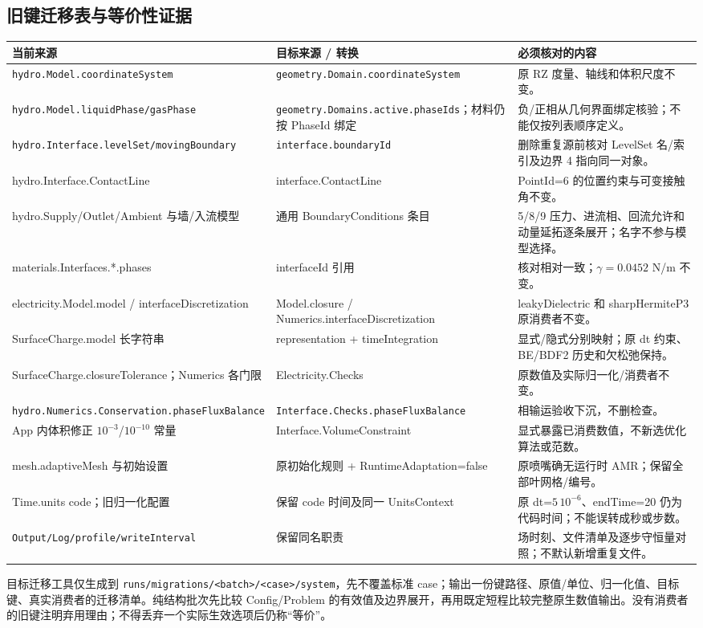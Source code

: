 \documentclass[UTF8,a4paper,11pt,fontset=fandol]{ctexart}
\numberwithin{equation}{section}
\newcommand{\code}[1]{\nolinkurl{#1}}
\begin{document}
\subsection{旧键迁移表与等价性证据}
\begin{longtable}{@{}P{.34\textwidth}P{.35\textwidth}P{.25\textwidth}@{}}
\toprule 当前来源 & 目标来源 / 转换 & 必须核对的内容\\\midrule\endhead
\code{hydro.Model.coordinateSystem} & \code{geometry.Domain.coordinateSystem} & 原 RZ 度量、轴线和体积尺度不变。\\
\code{hydro.Model.liquidPhase/gasPhase} & \code{geometry.Domains.active.phaseIds}；材料仍按 PhaseId 绑定 & 负/正相从几何界面绑定核验；不能仅按列表顺序定义。\\
\code{hydro.Interface.levelSet/movingBoundary} & \code{interface.boundaryId} & 删除重复源前核对 LevelSet 名/索引及边界 4 指向同一对象。\\
hydro.Interface.ContactLine & interface.ContactLine & PointId=6 的位置约束与可变接触角不变。\\
hydro.Supply/Outlet/Ambient 与墙/入流模型 & 通用 BoundaryConditions 条目 & 5/8/9 压力、进流相、回流允许和动量延拓逐条展开；名字不参与模型选择。\\
materials.Interfaces.*.phases & interfaceId 引用 & 核对相对一致；$\gamma=0.0452$ N/m 不变。\\
electricity.Model.model / interfaceDiscretization & Model.closure / Numerics.interfaceDiscretization & leakyDielectric 和 sharpHermiteP3 原消费者不变。\\
SurfaceCharge.model 长字符串 & representation + timeIntegration & 显式/隐式分别映射；原 dt 约束、BE/BDF2 历史和欠松弛保持。\\
SurfaceCharge.closureTolerance；Numerics 各门限 & Electricity.Checks & 原数值及实际归一化/消费者不变。\\
\code{hydro.Numerics.Conservation.phaseFluxBalance} & \code{Interface.Checks.phaseFluxBalance} & 相输运验收下沉，不删检查。\\
App 内体积修正 $10^{-3}$/$10^{-10}$ 常量 & Interface.VolumeConstraint & 显式暴露已消费数值，不新选优化算法或范数。\\
mesh.adaptiveMesh 与初始设置 & 原初始化规则 + RuntimeAdaptation=false & 原喷嘴确无运行时 AMR；保留全部叶网格/编号。\\
Time.units code；旧归一化配置 & 保留 code 时间及同一 UnitsContext & 原 dt=$5\,10^{-6}$、endTime=20 仍为代码时间；不能误转成秒或步数。\\
\code{Output/Log/profile/writeInterval} & 保留同名职责 & 场时刻、文件清单及逐步守恒量对照；不默认新增重复文件。\\
\bottomrule
\end{longtable}
目标迁移工具仅生成到 \code{runs/migrations/<batch>/<case>/system}，先不覆盖标准 case；输出一份键路径、原值/单位、归一化值、目标键、真实消费者的迁移清单。纯结构批次先比较 Config/Problem 的有效值及边界展开，再用既定短程比较完整原生数值输出。没有消费者的旧键注明弃用理由；不得丢弃一个实际生效选项后仍称“等价”。
\end{document}
